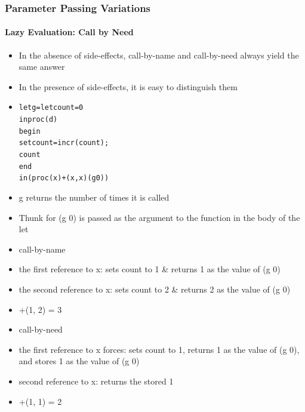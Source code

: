 \documentclass{beamer}
\begin{document}
\begin{frame}[fragile]
\frametitle{Parameter Passing Variations}
\framesubtitle{Lazy Evaluation: Call by Need}
\begin{scriptsize}
\begin{itemize}
\item<1-> In the absence of side-effects, call-by-name and call-by-need always yield the same answer

\item<2-> In the presence of side-effects, it is easy to distinguish them

\item<3->
\begin{alltt}
let g = let count = 0
        in proc (d)
	         begin
               set count = incr(count);
               count
	       end
in (proc (x) +(x, x) (g 0) )
\end{alltt}

\item<4-> g returns the number of times it is called

\item<4-> Thunk for (g 0) is passed as the argument to the function in the body of the let

\item<5-> call-by-name

\item<6-> the first reference to x: sets count to 1 \& returns 1 as the value of (g 0)

\item<7-> the second reference to x: sets count to 2 \& returns 2 as the value of (g 0)

\item<8-> +(1, 2) = 3

\item<9-> call-by-need

\item<10-> the first reference to x forces: sets count to 1, returns 1 as the value of (g 0), and stores 1 as the value of (g 0)
\item<11-> second reference to x: returns the stored 1 

\item<12>  +(1, 1) = 2

\end{itemize}
\end{scriptsize}
\end{frame}
\end{document}

